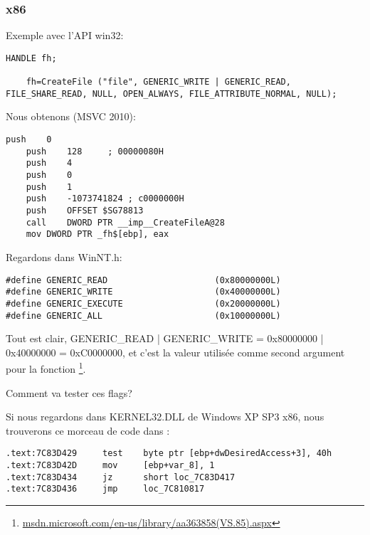 \subsubsection{x86}

Exemple avec l'API win32:

\begin{lstlisting}[style=customc]
	HANDLE fh;

	fh=CreateFile ("file", GENERIC_WRITE | GENERIC_READ, FILE_SHARE_READ, NULL, OPEN_ALWAYS, FILE_ATTRIBUTE_NORMAL, NULL);
\end{lstlisting}

Nous obtenons (MSVC 2010):

\begin{lstlisting}[caption=MSVC 2010,style=customasmx86]
	push	0
	push	128		; 00000080H
	push	4
	push	0
	push	1
	push	-1073741824	; c0000000H
	push	OFFSET $SG78813
	call	DWORD PTR __imp__CreateFileA@28
	mov	DWORD PTR _fh$[ebp], eax
\end{lstlisting}

Regardons dans WinNT.h:

\begin{lstlisting}[caption=WinNT.h,style=customc]
#define GENERIC_READ                     (0x80000000L)
#define GENERIC_WRITE                    (0x40000000L)
#define GENERIC_EXECUTE                  (0x20000000L)
#define GENERIC_ALL                      (0x10000000L)
\end{lstlisting}

Tout est clair,
GENERIC\_READ | GENERIC\_WRITE = 0x80000000 | 0x40000000 = 0xC0000000,
et c'est la valeur utilisée comme second argument pour la fonction
\footnote{\href{http://go.yurichev.com/17065}{msdn.microsoft.com/en-us/library/aa363858(VS.85).aspx}}.

Comment  va tester ces flags?

Si nous regardons dans KERNEL32.DLL de Windows XP SP3 x86, nous trouverons ce morceau
de code dans :

\begin{lstlisting}[caption=KERNEL32.DLL (Windows XP SP3 x86),style=customasmx86]
.text:7C83D429     test    byte ptr [ebp+dwDesiredAccess+3], 40h
.text:7C83D42D     mov     [ebp+var_8], 1
.text:7C83D434     jz      short loc_7C83D417
.text:7C83D436     jmp     loc_7C810817
\end{lstlisting}


